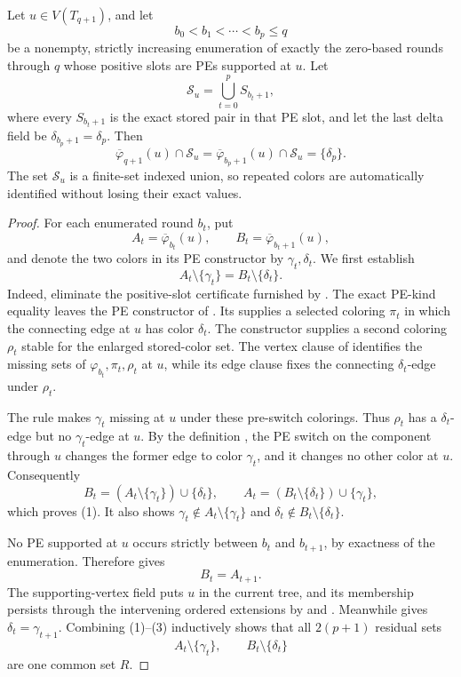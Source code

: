 \begin{lemma}
Let \(u\in V(T_{q+1})\), and let
\[
 b_0<b_1<\cdots<b_p\leq q
\]
be a nonempty, strictly increasing enumeration of exactly the zero-based
rounds through \(q\) whose positive slots are PEs supported at \(u\).
Let
\[
 \mathcal S_u=\bigcup_{t=0}^{p} S_{b_t+1},
\]
where every \(S_{b_t+1}\) is the exact stored pair in that PE slot, and
let the last delta field be \(\delta_{b_p+1}=\delta_p\).  Then
\[
 \overline\varphi_{q+1}(u)\cap\mathcal S_u
 =\overline\varphi_{b_p+1}(u)\cap\mathcal S_u
 =\{\delta_p\}.
\]
The set \(\mathcal S_u\) is a finite-set indexed union, so repeated
colors are automatically identified without losing their exact values.
\end{lemma}
\begin{proof}
For each enumerated round \(b_t\), put
\[
 A_t=\overline\varphi_{b_t}(u),\qquad
 B_t=\overline\varphi_{b_t+1}(u),
\]
and denote the two colors in its PE constructor by
\(\gamma_t,\delta_t\).  We first establish
\[
 A_t\setminus\{\gamma_t\}
   =B_t\setminus\{\delta_t\}.                                  \tag{1}
\]
Indeed, eliminate the positive-slot certificate furnished by
.  The exact PE-kind equality leaves the PE
constructor of .  Its
 supplies a selected coloring
\(\pi_t\) in which the connecting edge at \(u\) has color
\(\delta_t\).  The constructor supplies a second coloring \(\rho_t\)
stable for the enlarged stored-color set.  The vertex clause of
 identifies the missing sets of
\(\varphi_{b_t},\pi_t,\rho_t\) at \(u\), while its edge clause fixes the
connecting \(\delta_t\)-edge under \(\rho_t\).

The rule  makes \(\gamma_t\) missing at
\(u\) under these pre-switch colorings.  Thus \(\rho_t\) has a
\(\delta_t\)-edge but no \(\gamma_t\)-edge at \(u\).  By the definition
, the PE switch on the component through
\(u\) changes the former edge to color \(\gamma_t\), and it changes no
other color at \(u\).  Consequently
\[
 B_t=(A_t\setminus\{\gamma_t\})\cup\{\delta_t\},
 \qquad
 A_t=(B_t\setminus\{\delta_t\})\cup\{\gamma_t\},                \tag{2}
\]
which proves (1).  It also shows
\(\gamma_t\notin A_t\setminus\{\gamma_t\}\) and
\(\delta_t\notin B_t\setminus\{\delta_t\}\).

No PE supported at \(u\) occurs strictly between \(b_t\) and
\(b_{t+1}\), by exactness of the enumeration.  Therefore
 gives
\[
 B_t=A_{t+1}.                                                    \tag{3}
\]
The supporting-vertex field puts \(u\) in the current tree, and its
membership persists through the intervening ordered extensions by
 and
.  Meanwhile
 gives
\(\delta_t=\gamma_{t+1}\).  Combining (1)--(3) inductively shows that
all \(2(p+1)\) residual sets
\[
 A_t\setminus\{\gamma_t\},\qquad
 B_t\setminus\{\delta_t\}
\]
are one common set \(R\).


\end{proof}
